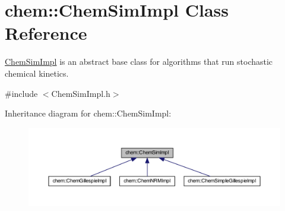 \hypertarget{classchem_1_1ChemSimImpl}{\section{chem\-:\-:Chem\-Sim\-Impl Class Reference}
\label{classchem_1_1ChemSimImpl}
}


\hyperlink{classchem_1_1ChemSimImpl}{Chem\-Sim\-Impl} is an abstract base class for algorithms that run stochastic chemical kinetics.  




{\ttfamily \#include $<$Chem\-Sim\-Impl.\-h$>$}



Inheritance diagram for chem\-:\-:Chem\-Sim\-Impl\-:\nopagebreak
\begin{figure}[H]
\begin{center}
\leavevmode
\includegraphics[width=350pt]{classchem_1_1ChemSimImpl__inherit__graph}
\end{center}
\end{figure}
